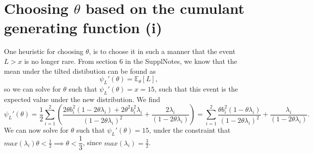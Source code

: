\documentclass{article}
\begin{document}
\section{Choosing $\theta$ based on the cumulant generating function (i)}
One heuristic for choosing $\theta$, is to choose it in such a manner that the event $L > x$ is no longer rare. From section 6 in the SupplNotes, we know that the mean under the tilted distibution can be found as
\begin{equation*}
    \psi_L'(\theta) = \mathbb{E}_\theta[L],
\end{equation*}
so we can solve for $\theta$ such that $\psi_L'(\theta) = x = 15$, such that this event is the expected value under the new distribution. We find
\begin{equation*}
    \psi_L'(\theta) = \dfrac{1}{2}\sum_{i = 1}^2\left(\dfrac{2\theta b_i^2(1-2\theta\lambda_i) + 2\theta^2b_i^2\lambda_i}{(1-2\theta\lambda_i)^2} + \dfrac{2\lambda_i}{(1 - 2\theta\lambda_i)}\right)  =\sum_{i = 1}^2 \dfrac{\theta b_i^2(1-\theta\lambda_i)}{(1-2\theta\lambda_i)^2} + \dfrac{\lambda_i}{(1 - 2\theta\lambda_i)}.
\end{equation*}
We can now solve for $\theta$ such that $\psi_L'(\theta) = 15$, under the constraint that $max(\lambda_i)\theta < \frac{1}{2} \implies \theta < \dfrac{1}{3}$, since $max(\lambda_i) = \frac{3}{2}$.
\end{document}
